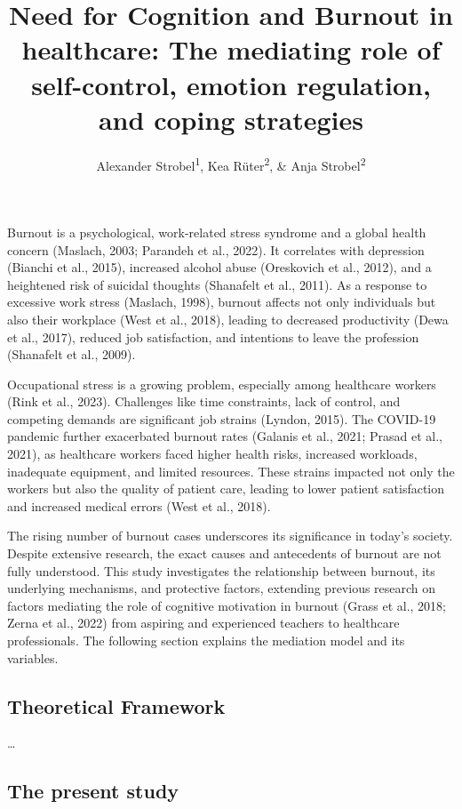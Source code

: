 \documentclass[
  english,
  man]{apa6}
\title{Need for Cognition and Burnout in healthcare: The mediating role of self-control, emotion regulation, and coping strategies}
\author{Alexander Strobel\textsuperscript{1}, Kea Rüter\textsuperscript{2}, \& Anja Strobel\textsuperscript{2}}
\date{}
\affiliation{\vspace{0.5cm}\textsuperscript{1} Faculty of Psychology, Technische Universität Dresden, Dresden, Germany\\\textsuperscript{2} Department of Psychology, Technische Universität Chemnitz, Chemnitz, Germany}
\begin{document}
\maketitle

Burnout is a psychological, work-related stress syndrome and a global health concern (Maslach, 2003; Parandeh et al., 2022).
It correlates with depression (Bianchi et al., 2015), increased alcohol abuse (Oreskovich et al., 2012), and a heightened risk of suicidal thoughts (Shanafelt et al., 2011).
As a response to excessive work stress (Maslach, 1998), burnout affects not only individuals but also their workplace (West et al., 2018), leading to decreased productivity (Dewa et al., 2017), reduced job satisfaction, and intentions to leave the profession (Shanafelt et al., 2009).

Occupational stress is a growing problem, especially among healthcare workers (Rink et al., 2023).
Challenges like time constraints, lack of control, and competing demands are significant job strains (Lyndon, 2015).
The COVID-19 pandemic further exacerbated burnout rates (Galanis et al., 2021; Prasad et al., 2021), as healthcare workers faced higher health risks, increased workloads, inadequate equipment, and limited resources.
These strains impacted not only the workers but also the quality of patient care, leading to lower patient satisfaction and increased medical errors (West et al., 2018).

The rising number of burnout cases underscores its significance in today's society.
Despite extensive research, the exact causes and antecedents of burnout are not fully understood.
This study investigates the relationship between burnout, its underlying mechanisms, and protective factors, extending previous research on factors mediating the role of cognitive motivation in burnout (Grass et al., 2018; Zerna et al., 2022) from aspiring and experienced teachers to healthcare professionals.
The following section explains the mediation model and its variables.

\subsection{Theoretical Framework}\label{theoretical-framework}

\ldots{}

\subsection{The present study}\label{the-present-study}
\end{document}
